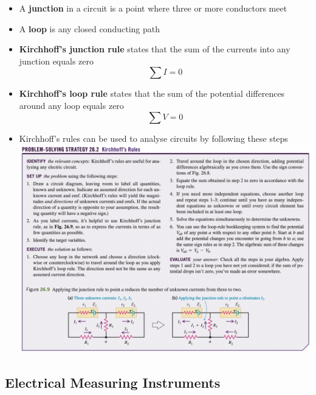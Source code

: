 \documentclass{article}
\begin{document}
\begin{itemize}
  \item A \textbf{junction} in a circuit is a point where three or more conductors meet

  \item A \textbf{loop} is any closed conducting path

  \item \textbf{Kirchhoff's junction rule} states that the sum of the currents into any junction equals zero \[\sum I = 0\]

  \item \textbf{Kirchhoff's loop rule} states that the sum of the potential differences around any loop equals zero \[\sum V = 0\]

  \item Kirchhoff's rules can be used to analyse circuits by following these steps \\ \includegraphics[scale=0.337]{kirchhoffs-rules}
\end{itemize}

\subsection{Electrical Measuring Instruments}
\end{document}
